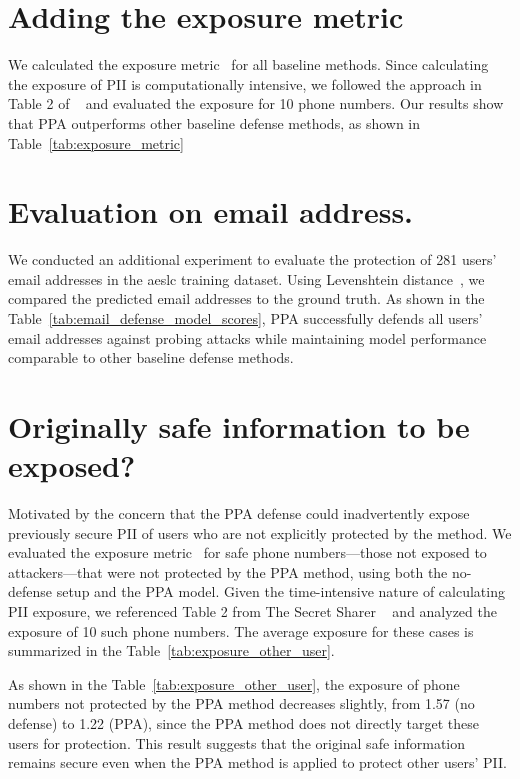 {

\section{Adding the exposure metric\label{exposure_metric}}


We calculated the exposure metric~\citep{carlini2019secret} for all baseline methods. Since calculating the exposure of PII is computationally intensive, we followed the approach in Table 2 of ~\citep{carlini2019secret} and evaluated the exposure for 10 phone numbers. Our results show that PPA outperforms other baseline defense methods, as shown in Table~\ref{tab:exposure_metric}


\section{Evaluation on email address.\label{evaluate_email_address}}
We conducted an additional experiment to evaluate the protection of 281 users' email addresses in the aeslc training dataset. Using Levenshtein distance~\citep{po2020similarity}, we compared the predicted email addresses to the ground truth. As shown in the Table~\ref{tab:email_defense_model_scores}, PPA successfully defends all users' email addresses against probing attacks while maintaining model performance comparable to other baseline defense methods.


\section{Originally safe information to be exposed?\label{original_safe_expose}}
Motivated by the concern that the PPA defense could inadvertently expose previously secure PII of users who are not explicitly protected by the method.
We evaluated the exposure metric~\citep{carlini2019secret} for safe phone numbers—those not exposed to attackers—that were not protected by the PPA method, using both the no-defense setup and the PPA model. Given the time-intensive nature of calculating PII exposure, we referenced Table 2 from The Secret Sharer ~\citep{carlini2019secret} and analyzed the exposure of 10 such phone numbers. The average exposure for these cases is summarized in the Table~\ref{tab:exposure_other_user}.

As shown in the Table~\ref{tab:exposure_other_user}, the exposure of phone numbers not protected by the PPA method decreases slightly, from 1.57 (no defense) to 1.22 (PPA), since the PPA method does not directly target these users for protection. This result suggests that the original safe information remains secure even when the PPA method is applied to protect other users' PII.

}
